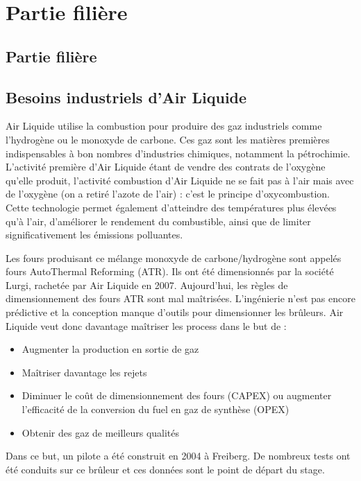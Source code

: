 \renewcommand\evenpagerightmark{{\scshape\small Filière Work for Centrale}}
\chapter[Partie filière]%
{Partie filière}
\label{Partie filière}

\section{Partie filière}

\section{Besoins industriels d'Air Liquide}

Air Liquide utilise la combustion pour produire des gaz industriels comme l'hydrogène ou le monoxyde de carbone. Ces gaz sont les matières premières indispensables à bon nombres d'industries chimiques, notamment la pétrochimie. L'activité première d'Air Liquide étant de vendre des contrats de l'oxygène qu'elle produit, l'activité combustion d'Air Liquide ne se fait pas à l'air mais avec de l'oxygène (on a retiré l'azote de l'air) : c'est le principe d'oxycombustion. Cette technologie permet également d'atteindre des températures plus élevées qu'à l'air, d'améliorer le rendement du combustible, ainsi que de limiter significativement les émissions polluantes.
    
Les fours produisant ce mélange monoxyde de carbone/hydrogène sont appelés fours AutoThermal Reforming (ATR). Ils ont été dimensionnés par la société Lurgi, rachetée par Air Liquide en 2007. Aujourd'hui, les règles de dimensionnement des fours ATR sont mal maîtrisées. L'ingénierie n'est pas encore prédictive et la conception manque d'outils pour dimensionner les brûleurs. Air Liquide veut donc davantage maîtriser les process dans le but de :
\begin{itemize}
\item Augmenter la production en sortie de gaz
\item Maîtriser davantage les rejets
\item Diminuer le coût de dimensionnement des fours (CAPEX) ou augmenter l'efficacité de la conversion du fuel en gaz de synthèse (OPEX)
\item Obtenir des gaz de meilleurs qualités
\end{itemize}

Dans ce but, un pilote a été construit en 2004 à Freiberg. De nombreux tests ont été conduits sur ce brûleur et ces données sont le point de départ du stage.


